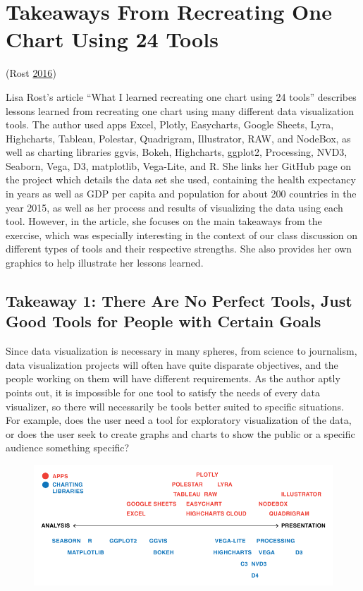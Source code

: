 \documentclass[]{book}
\theoremstyle{definition}
\theoremstyle{definition}
\theoremstyle{definition}
\theoremstyle{remark}
\begin{document}
\section{Takeaways From Recreating One Chart Using 24
Tools}\label{takeaways-from-recreating-one-chart-using-24-tools}

(Rost \protect\hyperlink{ref-different_tools}{2016})

Lisa Rost's article ``What I learned recreating one chart using 24
tools'' describes lessons learned from recreating one chart using many
different data visualization tools. The author used apps Excel, Plotly,
Easycharts, Google Sheets, Lyra, Highcharts, Tableau, Polestar,
Quadrigram, Illustrator, RAW, and NodeBox, as well as charting libraries
ggvis, Bokeh, Highcharts, ggplot2, Processing, NVD3, Seaborn, Vega, D3,
matplotlib, Vega-Lite, and R. She links her GitHub page on the project
which details the data set she used, containing the health expectancy in
years as well as GDP per capita and population for about 200 countries
in the year 2015, as well as her process and results of visualizing the
data using each tool. However, in the article, she focuses on the main
takeaways from the exercise, which was especially interesting in the
context of our class discussion on different types of tools and their
respective strengths. She also provides her own graphics to help
illustrate her lessons learned.

\subsection{Takeaway 1: There Are No Perfect Tools, Just Good Tools for
People with Certain
Goals}\label{takeaway-1-there-are-no-perfect-tools-just-good-tools-for-people-with-certain-goals}

Since data visualization is necessary in many spheres, from science to
journalism, data visualization projects will often have quite disparate
objectives, and the people working on them will have different
requirements. As the author aptly points out, it is impossible for one
tool to satisfy the needs of every data visualizer, so there will
necessarily be tools better suited to specific situations. For example,
does the user need a tool for exploratory visualization of the data, or
does the user seek to create graphs and charts to show the public or a
specific audience something specific?

\begin{figure}
\centering
\includegraphics{images/analysis_spectrum.png}
\caption{}
\end{figure}
\end{document}
